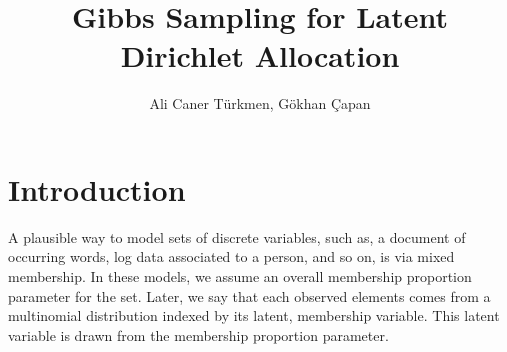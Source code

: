 \documentclass{article}%
\begin{document}
\title{Gibbs Sampling for Latent Dirichlet Allocation}

\author{Ali Caner T\" urkmen, G\" okhan \c Capan}
\date{}

\maketitle

\section{Introduction}
A plausible way to model sets of discrete variables, such as, a document of occurring words, log data associated to a person, and so on, is via mixed membership. In these models, we assume an overall membership proportion parameter for the set. Later, we say that each observed elements comes from a multinomial distribution indexed by its latent, membership variable. This latent variable is drawn from the membership proportion parameter. 
\end{document}
